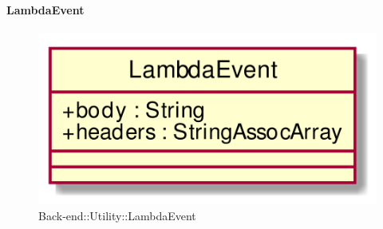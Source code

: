 \hypertarget{LambdaEvent_label}{\paragraph{LambdaEvent}}
\begin{figure}[h]
	\centering
	\includegraphics[width=\textwidth,height=\textheight,keepaspectratio]{images/ClassLambdaEvent.png}
	\caption{Back-end::Utility::LambdaEvent}
\end{figure}
